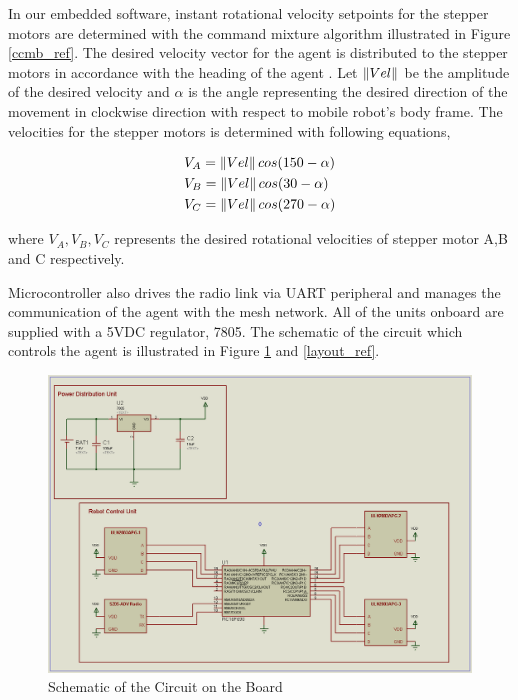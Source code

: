 In our embedded software, instant rotational velocity setpoints for the stepper motors  are determined with the command mixture algorithm illustrated in Figure \ref{ccmb_ref}. The desired velocity vector for the agent is  distributed to the stepper motors in accordance with the heading of the agent . Let $\left\lVert Vel\right\rVert$ be the amplitude of the desired velocity and $\alpha$ is the angle representing the desired direction of the movement in clockwise direction with respect to mobile robot's body frame.  The velocities for the stepper motors is determined with following equations,
		
\begin{align}
& V_A = \left\lVert Vel\right\rVert cos(150-\alpha) \\
& V_B = \left\lVert Vel\right\rVert cos(30 -\alpha) \\
& V_C = \left\lVert Vel\right\rVert cos(270-\alpha) 
\end{align}  

where $V_A, V_B, V_C$ represents the desired rotational velocities of  stepper motor A,B and C respectively.
		
Microcontroller also drives the radio link via UART peripheral and manages the communication of the agent with the mesh network. All of the units onboard are supplied with a 5VDC regulator, 7805. The schematic of the circuit which controls the agent is illustrated in Figure \ref{sematik_ref} and \ref{layout_ref}.
		
\begin{figure}[H]
\caption{Schematic of the Circuit on the Board} \label{sematik_ref}
\centerline{\includegraphics[scale = 0.40]{sematik}}
\end{figure} 

